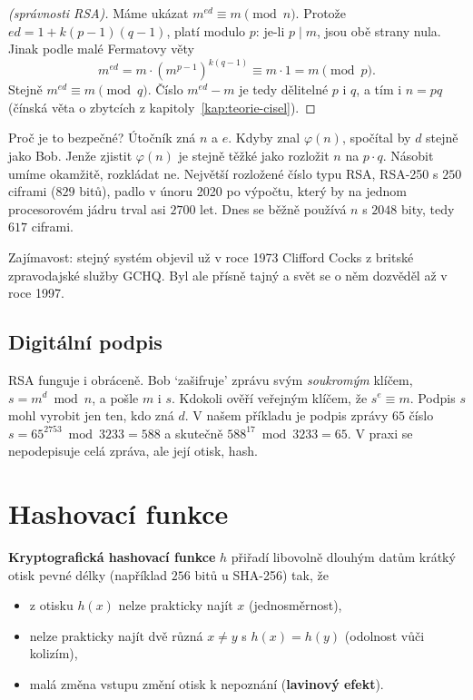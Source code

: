 \begin{proof}[(správnosti RSA)]
  Máme ukázat $m^{ed}\equiv m\pmod n$. Protože $ed = 1 + k(p - 1)(q - 1)$, platí modulo $p$: je-li $p\mid m$, jsou obě strany nula. Jinak podle malé Fermatovy věty
  \begin{equation*}
    m^{ed} = m\cdot{\left(m^{p-1}\right)}^{k(q-1)}\equiv m\cdot 1 = m\pmod p.
  \end{equation*}
  Stejně $m^{ed}\equiv m\pmod q$. Číslo $m^{ed} - m$ je tedy dělitelné $p$ i $q$, a tím i $n = pq$ (čínská věta o zbytcích z kapitoly~\ref{kap:teorie-cisel}).
\end{proof}

Proč je to bezpečné? Útočník zná $n$ a $e$. Kdyby znal $\varphi(n)$, spočítal by $d$ stejně jako Bob. Jenže zjistit $\varphi(n)$ je stejně těžké jako rozložit $n$ na $p\cdot q$. Násobit umíme okamžitě, rozkládat ne. Největší rozložené číslo typu RSA, RSA-250 s $250$ ciframi ($829$ bitů), padlo v únoru 2020 po výpočtu, který by na jednom procesorovém jádru trval asi $2700$ let. Dnes se běžně používá $n$ s $2048$ bity, tedy $617$ ciframi.

Zajímavost: stejný systém objevil už v roce 1973 Clifford Cocks z britské zpravodajské služby GCHQ. Byl ale přísně tajný a svět se o něm dozvěděl až v roce 1997.

\subsection{Digitální podpis}

RSA funguje i obráceně. Bob `zašifruje' zprávu svým \textit{soukromým} klíčem, $s = m^d\bmod n$, a pošle $m$ i $s$. Kdokoli ověří veřejným klíčem, že $s^e\equiv m$. Podpis $s$ mohl vyrobit jen ten, kdo zná $d$. V našem příkladu je podpis zprávy $65$ číslo $s = 65^{2753}\bmod 3233 = 588$ a skutečně $588^{17}\bmod 3233 = 65$. V praxi se nepodepisuje celá zpráva, ale její otisk, hash.

\section{Hashovací funkce}

\begin{definitionbox}
  \textbf{Kryptografická hashovací funkce} $h$ přiřadí libovolně dlouhým datům krátký otisk pevné délky (například $256$ bitů u SHA-256) tak, že
  \begin{itemize}
    \item z otisku $h(x)$ nelze prakticky najít $x$ (jednosměrnost),
    \item nelze prakticky najít dvě různá $x\neq y$ s $h(x) = h(y)$ (odolnost vůči kolizím),
    \item malá změna vstupu změní otisk k nepoznání (\textbf{lavinový efekt}).
  \end{itemize}
\end{definitionbox}

